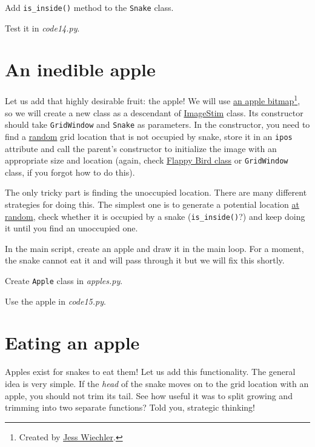 \documentclass[
]{book}
\begin{document}
Add \texttt{is\_inside()} method to the \texttt{Snake} class.

Test it in \emph{code14.py}.

\hypertarget{an-inedible-apple}{%
\section{An inedible apple}\label{an-inedible-apple}}

Let us add that highly desirable fruit: the apple! We will use \href{material/apple.png}{an apple bitmap}\footnote{Created by \href{https://openclipart.org/artist/cyanidecupcake}{Jess Wiechler}.}, so we will create a new class as a descendant of \href{https://psychopy.org/api/visual/imagestim.html\#psychopy.visual.ImageStim}{ImageStim} class. Its constructor should take \texttt{GridWindow} and \texttt{Snake} as parameters. In the constructor, you need to find a \href{https://docs.python.org/3/library/random.html\#random.randrange}{random} grid location that is not occupied by snake, store it in an \texttt{ipos} attribute and call the parent's constructor to initialize the image with an appropriate size and location (again, check \protect\hyperlink{flappy-bird-class}{Flappy Bird class} or \texttt{GridWindow} class, if you forgot how to do this).

The only tricky part is finding the unoccupied location. There are many different strategies for doing this. The simplest one is to generate a potential location \href{https://docs.python.org/3/library/random.html\#random.randrange}{at random}, check whether it is occupied by a snake (\texttt{is\_inside()}?) and keep doing it until you find an unoccupied one.

In the main script, create an apple and draw it in the main loop. For a moment, the snake cannot eat it and will pass through it but we will fix this shortly.

Create \texttt{Apple} class in \emph{apples.py}.

Use the apple in \emph{code15.py}.

\hypertarget{eating-an-apple}{%
\section{Eating an apple}\label{eating-an-apple}}

Apples exist for snakes to eat them! Let us add this functionality. The general idea is very simple. If the \emph{head} of the snake moves on to the grid location with an apple, you should not trim its tail. See how useful it was to split growing and trimming into two separate functions? Told you, strategic thinking!
\end{document}
